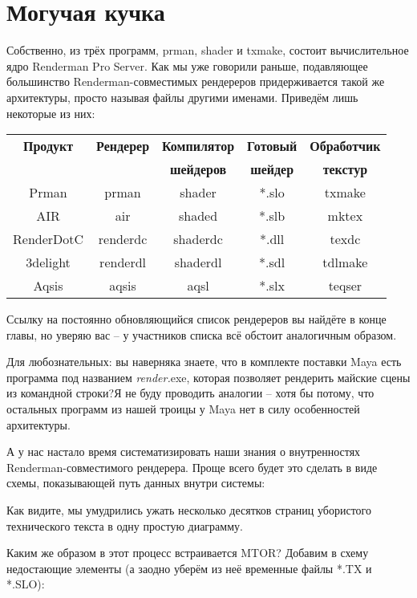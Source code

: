 \section*{Могучая кучка}
Собственно, из трёх программ, prman, shader и
   txmake, состоит вычислительное ядро Renderman Pro Server. Как мы
   уже говорили раньше, подавляющее большинство Renderman-совместимых
   рендереров придерживается такой же архитектуры, просто называя
   файлы другими именами. Приведём лишь некоторые из них:
 
\begin{tabular}{ | c | c | c | c | c | }
\hline
\textbf{Продукт} & \textbf{Рендерер} & \textbf{Компилятор} & \textbf{Готовый} & \textbf{Обработчик}\\
  &   & \textbf{шейдеров} & \textbf{шейдер} & \textbf{текстур}\\
\hline
Prman & prman & shader & *.slo & txmake \\
\hline
AIR & air & shaded & *.slb & mktex \\
\hline
RenderDotC & renderdc & shaderdc & *.dll & texdc \\
\hline
3delight & renderdl & shaderdl & *.sdl & tdlmake \\
\hline
Aqsis & aqsis & aqsl & *.slx & teqser \\
\hline
\end{tabular}   
 

Ссылку на постоянно обновляющийся список рендереров
   вы найдёте в конце главы, но уверяю вас – у участников списка всё
   обстоит аналогичным образом.
 

Для
   любознательных: вы наверняка знаете,
   что в комплекте поставки Maya есть
   программа под названием {\it render.}exe, которая
   позволяет рендерить майские сцены из командной строки?Я не буду
   проводить аналогии – хотя бы потому, что остальных программ из
   нашей троицы у Maya нет в силу
   особенностей архитектуры.
 

А у нас настало время систематизировать наши знания
   о внутренностях Renderman-совместимого рендерера. Проще всего будет
   это сделать в виде схемы, показывающей путь данных внутри
   системы:
 

 

Как видите, мы умудрились ужать несколько десятков
   страниц убористого технического текста в одну простую
   диаграмму.
 

Каким же образом в этот процесс встраивается MTOR?
   Добавим в схему недостающие элементы (а заодно уберём из неё
   временные файлы *.TX и *.SLO):
 

